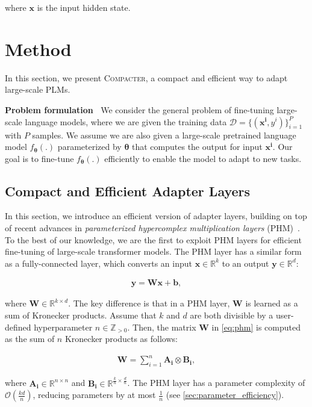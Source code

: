 where $\bm{x}$ is the input hidden state.

\section{Method}
In this section, we present \textsc{Compacter}, a compact and efficient way to adapt large-scale PLMs. 

 \textbf{Problem formulation} $\:$ We consider the general problem of fine-tuning large-scale language models, where we are given the training data  $\mathcal{D}= \{(\bm{x^i}, y^i)\}_{i=1}^{P}$ with $P$ samples. We assume we are also given a large-scale pretrained language model $f_{\bm{\theta}}(.)$ parameterized by $\bm{\theta}$ that computes the output for input $\bm{x^i}$.
Our goal is to fine-tune  $f_{\bm{\theta}}(.)$ efficiently to  enable the model to adapt to new tasks. 

\subsection{Compact and Efficient Adapter Layers} \label{sec:compacter}
In this section, we introduce an efficient version of adapter layers, building on top of recent advances in \emph{parameterized hypercomplex multiplication layers} (PHM)~\citep{zhang2021beyond}.  To the best of our knowledge, we are the first to exploit PHM layers for efficient fine-tuning of large-scale transformer models. The PHM layer has a similar form as a fully-connected layer, which converts an input $\bm{x}\in\mathbb{R}^k$ to an output $\bm{y}\in\mathbb{R}^d$:

\begin{align}
    \bm{y} =  \bm{W}\bm{x}+\bm{b}, \label{eq:phm}  
\end{align}

 where $\bm{W}\in\mathbb{R}^{k\times d}$. The key difference is that in a PHM layer, $\bm{W}$ is learned as a sum of Kronecker products. Assume that $k$ and $d$ are both divisible by a user-defined hyperparameter $n \in \mathbb{Z}_{>0}$. Then, the matrix $\bm{W}$ in \eqref{eq:phm} is computed as the sum of $n$ Kronecker products as follows:

\begin{align}
\bm{W} = \sum_{i=1}^n \bm{A_i} \otimes \bm{B_i}, 
\label{eq:phm-params} 
\end{align}

where $\bm{A_i}\in\mathbb{R}^{n\times n}$ and $\bm{B_i}\in\mathbb{R}^{\frac{k}{n}\times \frac{d}{n}}$. The PHM layer has a parameter complexity of $\mathcal{O}(\frac{kd}{n})$, reducing parameters by at most $\frac{1}{n}$ \citep{zhang2021beyond} (see \textsection \ref{sec:parameter_efficiency}).

